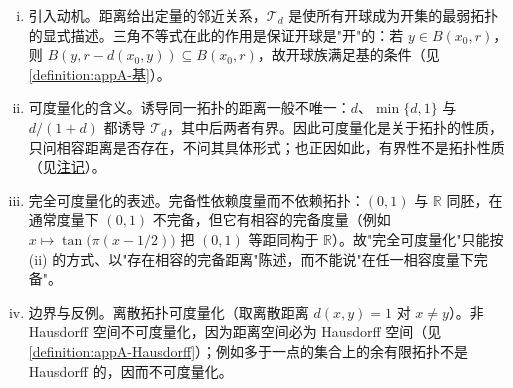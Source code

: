 \documentclass[../main.tex]{subfiles}
\begin{document}
\begin{remark}\label{remark:appA-距离与可度量化}
\begin{enumerate}[(i)]
\item 引入动机。距离给出定量的邻近关系，$\mathscr{T}_d$ 是使所有开球成为开集的最弱拓扑的显式描述。三角不等式在此的作用是保证开球是"开"的：若 $y\in B(x_0,r)$，则 $B(y,r-d(x_0,y))\subseteq B(x_0,r)$，故开球族满足基的条件（见\cref{definition:appA-基}）。
\item 可度量化的含义。诱导同一拓扑的距离一般不唯一：$d$、$\min\{d,1\}$ 与 $d/(1+d)$ 都诱导 $\mathscr{T}_d$，其中后两者有界。因此可度量化是关于拓扑的性质，只问相容距离是否存在，不问其具体形式；也正因如此，有界性不是拓扑性质（见\hyperref[remark:appA-距离直径]{注记}）。
\item 完全可度量化的表述。完备性依赖度量而不依赖拓扑：$(0,1)$ 与 $\mathbb{R}$ 同胚，在通常度量下 $(0,1)$ 不完备，但它有相容的完备度量（例如 $x\mapsto\tan\bigl(\pi(x-1/2)\bigr)$ 把 $(0,1)$ 等距同构于 $\mathbb{R}$）。故"完全可度量化"只能按 (ii) 的方式、以"存在相容的完备距离"陈述，而不能说"在任一相容度量下完备"。
\item 边界与反例。离散拓扑可度量化（取离散距离 $d(x,y)=1$ 对 $x\neq y$）。非 Hausdorff 空间不可度量化，因为距离空间必为 Hausdorff 空间（见\cref{definition:appA-Hausdorff}）；例如多于一点的集合上的余有限拓扑不是 Hausdorff 的，因而不可度量化。
\end{enumerate}
\end{remark}
\end{document}
